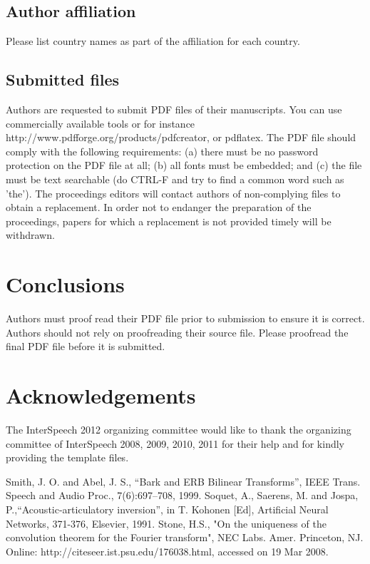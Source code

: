 \documentclass[a4paper]{article}
\begin{document}
\subsection{Author affiliation}
Please list country names as part of the affiliation for each country.


\subsection{Submitted files}
Authors are requested to submit PDF files of their manuscripts.
You can use commercially available tools or for instance http://www.pdfforge.org/products/pdfcreator, or pdflatex.
The PDF file should comply with the following requirements:
(a) there must be no password protection on the PDF file at all;
(b) all fonts must be embedded; and
(c) the file must be text searchable (do CTRL-F and try to find a common word such as 'the').
The proceedings editors will contact authors of non-complying files to obtain a replacement.
In order not to endanger the preparation of the proceedings, papers for which a replacement is not provided timely will be withdrawn.


\section{Conclusions}
Authors must proof read their PDF file prior to submission to ensure it is correct.
Authors should not rely on proofreading their source file.
Please proofread the final PDF file before it is submitted.

\section{Acknowledgements}
The InterSpeech 2012 organizing committee would like to thank the organizing committee of InterSpeech 2008, 2009, 2010, 2011 for their help and for kindly providing the template files.

\eightpt

\begin{thebibliography}{10}
 Smith, J. O. and Abel, J. S., 
``Bark and {ERB} Bilinear Transforms'', 
IEEE Trans. Speech and Audio Proc., 7(6):697--708, 1999.  
 Soquet, A., Saerens, M. and Jospa, P.,``Acoustic-articulatory
inversion'', in T. Kohonen [Ed], Artificial Neural Networks, 371-376,
Elsevier, 1991.
 Stone, H.S., "On the uniqueness of the convolution theorem
for the Fourier transform", NEC Labs. Amer. Princeton, NJ. 
Online: http://citeseer.ist.psu.edu/176038.html, accessed on 19 Mar 2008.
\end{thebibliography}
\end{document}
